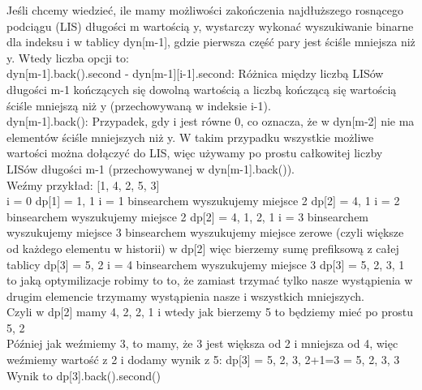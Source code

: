 \documentclass[12pt]{article}
\begin{document}
Jeśli chcemy wiedzieć, ile mamy możliwości zakończenia najdłuższego rosnącego podciągu (LIS) długości m wartością y, wystarczy wykonać wyszukiwanie binarne dla indeksu i w tablicy dyn[m-1], gdzie pierwsza część pary jest ściśle mniejsza niż y. Wtedy liczba opcji to:\\

dyn[m-1].back().second - dyn[m-1][i-1].second: Różnica między liczbą LISów długości m-1 kończących się dowolną wartością a liczbą kończącą się wartością ściśle mniejszą niż y (przechowywaną w indeksie i-1).\\

dyn[m-1].back(): Przypadek, gdy i jest równe 0, co oznacza, że w dyn[m-2] nie ma elementów ściśle mniejszych niż y. W takim przypadku wszystkie możliwe wartości można dołączyć do LIS, więc używamy po prostu całkowitej liczby LISów długości m-1 (przechowywanej w dyn[m-1].back()).\\


Weźmy przykład:
[1, 4, 2, 5, 3]\\

i = 0
dp[1] = {{1, 1}}
i = 1
binsearchem wyszukujemy miejsce 2 
dp[2] = {{4, 1}}
i = 2
binsearchem wyszukujemy miejsce 2 
dp[2] = {{4, 1}, {2, 1}}
i = 3 
binsearchem wyszukujemy miejsce 3 
binsearchem wyszukujemy miejsce zerowe (czyli większe od każdego elementu w historii) w dp[2]
więc bierzemy sumę prefiksową z całej tablicy 
dp[3] = {{5, 2}}
i = 4
binsearchem wyszukujemy miejsce 3
dp[3] = {{5, 2}, {3, 1}}\\

to jaką optymilizacje robimy to to, że zamiast trzymać tylko nasze wystąpienia w drugim elemencie trzymamy wystąpienia nasze i wszystkich mniejszych. \\

Czyli w dp[2] mamy {{4, 2}, {2, 1}} i wtedy jak bierzemy 5 to będziemy mieć po prostu {5, 2}\\

Później jak weźmiemy 3, to mamy, że 3 jest większa od 2 i mniejsza od 4, więc weźmiemy wartość z 2 i dodamy wynik z 5:
dp[3] = {{5, 2}, {3, 2+1=3}} = {{5, 2}, {3, 3}}\\

Wynik to dp[3].back().second()\\
\end{document}
